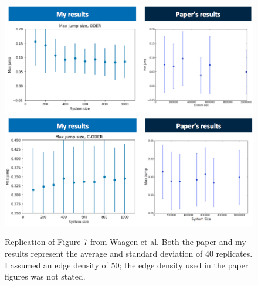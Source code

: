 \documentclass[11pt, oneside]{article}   	%
\begin{document}
\begin{figure}[h]
\centering
\includegraphics[width =\textwidth]{figs/fig7-oder.png}
\includegraphics[width =\textwidth]{figs/fig7-coder.png}
\caption{Replication of Figure 7 from Waagen et al. Both the paper and my results represent the average and standard deviation of 40 replicates. I assumed an edge density of 50; the edge density used in the paper figures was not stated.}
\label{fig:fig7}
\end{figure}
\end{document}
